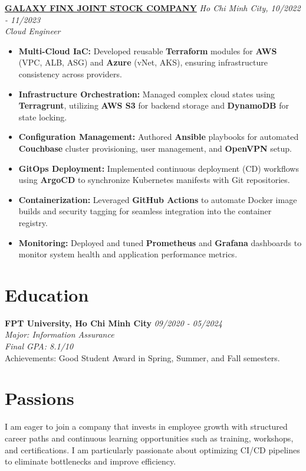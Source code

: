 \documentclass[a4paper,10pt]{article}
\begin{document}
\vspace{10pt}
\noindent \textbf{\href{https://www.linkedin.com/company/galaxy-finx/posts/?feedView=all}{GALAXY FINX JOINT STOCK COMPANY}} \hfill \textit{Ho Chi Minh City, 10/2022 - 11/2023} \\
\textit{Cloud Engineer} \\
\begin{itemize}[leftmargin=*, itemsep=2pt]
    \item \textbf{Multi-Cloud IaC:} Developed reusable \textbf{Terraform} modules for \textbf{AWS} (VPC, ALB, ASG) and \textbf{Azure} (vNet, AKS), ensuring infrastructure consistency across providers.
    \item \textbf{Infrastructure Orchestration:} Managed complex cloud states using \textbf{Terragrunt}, utilizing \textbf{AWS S3} for backend storage and \textbf{DynamoDB} for state locking.
    \item \textbf{Configuration Management:} Authored \textbf{Ansible} playbooks for automated \textbf{Couchbase} cluster provisioning, user management, and \textbf{OpenVPN} setup.
    \item \textbf{GitOps Deployment:} Implemented continuous deployment (CD) workflows using \textbf{ArgoCD} to synchronize Kubernetes manifests with Git repositories.
    \item \textbf{Containerization:} Leveraged \textbf{GitHub Actions} to automate Docker image builds and security tagging for seamless integration into the container registry.
    \item \textbf{Monitoring:} Deployed and tuned \textbf{Prometheus} and \textbf{Grafana} dashboards to monitor system health and application performance metrics.
\end{itemize}

\vspace{10pt}

\section*{Education}
\noindent \textbf{FPT University, Ho Chi Minh City} \hfill \textit{09/2020 - 05/2024} \\
\textit{Major: Information Assurance} \\
\textit{Final GPA: 8.1/10} \\
Achievements: Good Student Award in Spring, Summer, and Fall semesters.

\vspace{5pt}
\section*{Passions}
I am eager to join a company that invests in employee growth with structured career paths and continuous learning opportunities such as training, workshops, and certifications. I am particularly passionate about optimizing CI/CD pipelines to eliminate bottlenecks and improve efficiency.
\end{document}
